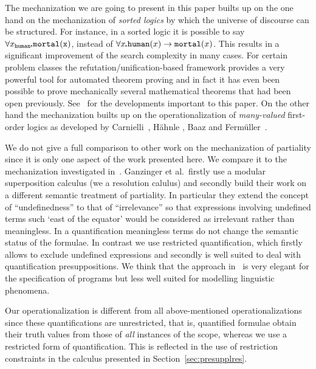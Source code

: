 \documentclass{\filespath jancl}
\def\sdot{\rule{.3ex}{.3ex}\hspace{-0.4ex}\;} %
\newcommand{\all}[3]{\forall {#1}_{#2}\sdot #3}
\def\sf{\tt}
\begin{document}
The mechanization we are going to present in this paper builts up on
the one hand on the mechanization of \textit{sorted logics} by which
the universe of discourse can be structured.  For instance, in a
sorted logic it is possible to say $\all{x}{{\sf human}}{\sf
  mortal}(x)$, instead of $\forall x\sdot {\sf human}(x) \implies {\sf
  mortal}(x)$. This results in a significant improvement of the search
complexity in many cases.  For certain problem classes the
refutation/unification-based framework provides a very powerful tool
for automated theorem proving and in fact it has even been possible to
prove mechanically several mathematical theorems that had been open
previously.  See~\cite{WeGaRo:sfv96} for the developments important to
this paper. On the other hand the mechanization builts up on the
operationalization of \textit{many-valued} first-order logics as
developed by Carnielli~\cite{Carnielli87}, H\"ahnle
\cite{Haehnle:adimvl94}, Baaz and Ferm\"uller~\cite{BaFe92}.

We do not give a full comparison to other work on the mechanization of
partiality since it is only one aspect of the work presented here. We
compare it to the mechanization investigated
in~\cite{GaSoWa06}. Ganzinger et al.\ firstly use a modular
superposition calculus (we a resolution calulus) and secondly build
their work on a different semantic treatment of partiality. In
particular they extend the concept of ``undefinedness'' to that of
``irrelevance'' so that expressions involving undefined terms such
`east of the equator' would be considered as irrelevant rather than
meaningless. In a quantification meaningless terms do
not change the semantic status of the formulae.  In contrast we use
restricted quantification, which firstly allows to exclude undefined
expressions and secondly is well suited to deal with quantification
presuppositions.  We think that the approach in~\cite{GaSoWa06} is
very elegant for the specification of programs but less well suited
for modelling linguistic phenomena.

Our operationalization is different from all above-mentioned
operationalizations since these quantifications are unrestricted, that
is, quantified formulae obtain their truth values from those of {\em
  all\/} instances of the scope, whereas we use a restricted form of
quantification.  This is reflected in the use of restriction
constraints in the calculus presented in Section~\ref{sec:presupplres}.
\end{document}
